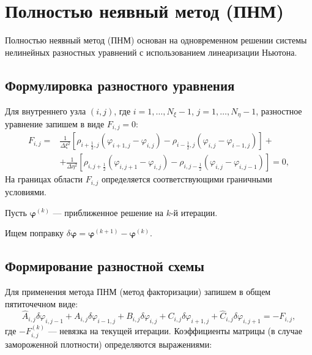 \section{Полностью неявный метод (ПНМ)}
	
	Полностью неявный метод (ПНМ) основан на одновременном решении системы нелинейных разностных уравнений с использованием линеаризации Ньютона.
	
	
	
	\subsection{Формулировка разностного уравнения}
	Для внутреннего узла $(i,j)$, где $i = 1,\dots,N_\xi-1$, $j = 1,\dots,N_\eta-1$, разностное уравнение запишем в виде $F_{i,j} = 0$:
	\begin{equation}
		\begin{aligned}
			F_{i,j} = &\frac{1}{\Delta \xi^2} \left[ \rho_{i+\frac{1}{2},j} (\varphi_{i+1,j} - \varphi_{i,j}) - \rho_{i-\frac{1}{2},j} (\varphi_{i,j} - \varphi_{i-1,j}) \right] + \\
			&+ \frac{1}{\Delta \eta^2} \left[ \rho_{i,j+\frac{1}{2}} (\varphi_{i,j+1} - \varphi_{i,j}) - \rho_{i,j-\frac{1}{2}} (\varphi_{i,j} - \varphi_{i,j-1}) \right] = 0,
		\end{aligned}
		\label{eq:F}
	\end{equation}
	На границах области $F_{i,j}$ определяется соответствующими граничными условиями.
	
	Пусть $\boldsymbol{\varphi}^{(k)}$ — приближенное решение на $k$-й итерации. 
	
	Ищем поправку $\delta \boldsymbol{\varphi} = \boldsymbol{\varphi}^{(k+1)} - \boldsymbol{\varphi}^{(k)}$.


	\subsection{Формирование разностной схемы }
	
	Для применения метода ПНМ (метод факторизации) запишем в общем пятиточечном виде:
	\begin{equation}
		\hat{A}_{i,j} \delta \varphi_{i,j-1} + A_{i,j} \delta \varphi_{i-1,j} + B_{i,j} \delta \varphi_{i,j} + C_{i,j} \delta \varphi_{i+1,j} + \hat{C}_{i,j} \delta \varphi_{i,j+1} = -F_{i,j},
		\label{eq:sip_stencil}
	\end{equation}
	где $ -F_{i,j}^{(k)}$ — невязка на текущей итерации. Коэффициенты матрицы (в случае замороженной плотности) определяются выражениями:
	
